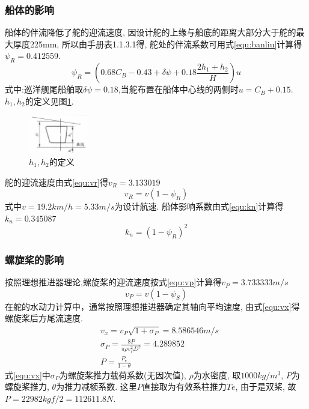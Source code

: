 \documentclass[a4paper,UTF8]{article}
\begin{document}
\subsubsection{船体的影响}
船体的伴流降低了舵的迎流速度, 因设计舵的上缘与船底的距离大部分大于舵的最大厚度225mm, 所以由手册表1.1.3.1得, 舵处的伴流系数可用式\ref{equ:banliu}计算得$\psi_{R}=0.412559$.
\begin{equation}\label{equ:banliu}
	\psi_{R}=(0.68C_{B}-0.43+\delta\psi+0.18\frac{2h_{1}+h_{2}}{H})u
\end{equation}
式中:巡洋舰尾船舶取$\delta\psi=0.18$,当舵布置在船体中心线的两侧时$u=C_{B}+0.15$.$h_{1}, h_{2}$的定义见图\ref{fig:h1h2}.\\
\begin{figure}
	\centering
	\includegraphics[width=1in]{figure/h1h2}
	\caption{$h_{1}, h_{2}$的定义}
	\label{fig:h1h2}
\end{figure}
舵的迎流速度由式\ref{equ:vr}得$v_{R}=3.133019$
\begin{equation}\label{equ:vr}
	v_{R}=v(1-\psi_{R})
\end{equation}
式中$v=19.2km/h=5.33m/s$为设计航速.
船体影响系数由式\ref{equ:kn}计算得$k_{n}=0.345087$
\begin{equation}\label{equ:kn}
	k_{n}=(1-\psi_{R})^2
\end{equation}
\subsubsection{螺旋桨的影响}
按照理想推进器理论,螺旋桨的迎流速度按式\ref{equ:vp}计算得$v_{P}=3.733333m/s$
\begin{equation}\label{equ:vp}
	v_{P}=v(1-\psi_{S})
\end{equation}
在舵的水动力计算中，通常按照理想推进器确定其轴向平均速度, 由式\ref{equ:vx}得螺旋桨后方尾流速度.
\begin{equation}\label{equ:vx}
\begin{split}
&v_{x}=v_{P}\sqrt{1+\sigma_{P}}=8.586546m/s\\
&\sigma_{P}=\frac{8P}{\pi\rho v_{P}^2D^2}=4.289852\\
&P = \frac{P_{e}}{1-\theta}
\end{split}
\end{equation}
式\ref{equ:vx}中$\sigma_{P}$为螺旋桨推力载荷系数(无因次值), $\rho$为水密度, 取$1000kg/m^3$, $P$为螺旋桨推力, $\theta$为推力减额系数. 这里$P$直接取为有效系柱推力$Te$, 由于是双桨, 故$P=22982kgf/2=112611.8N$.
\end{document}
